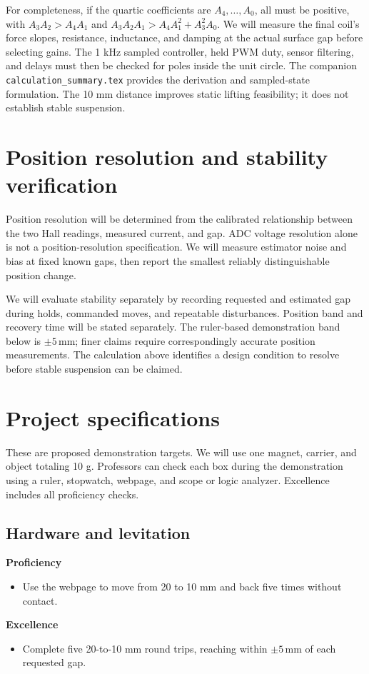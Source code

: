 \documentclass[11pt,letterpaper]{article}
\newcommand{\checkitem}{\item[$\square$]}
\begin{document}
For completeness, if the quartic coefficients are \(A_4,\ldots,A_0\),
all must be positive, with \(A_3A_2>A_4A_1\) and
\(A_3A_2A_1>A_4A_1^2+A_3^2A_0\). We will measure the final coil's
force slopes, resistance, inductance, and damping at the actual surface
gap before selecting gains. The 1 kHz sampled controller, held PWM duty,
sensor filtering, and delays must then be checked for poles inside the
unit circle. The companion \texttt{calculation\_summary.tex} provides the
derivation and sampled-state formulation. The 10 mm distance improves
static lifting feasibility; it does not establish stable suspension.

\section{Position resolution and stability verification}
Position resolution will be determined from the calibrated relationship
between the two Hall readings, measured current, and gap. ADC voltage
resolution alone is not a position-resolution specification. We will
measure estimator noise and bias at fixed known gaps, then report the
smallest reliably distinguishable position change.

We will evaluate stability separately by recording requested and estimated
gap during holds, commanded moves, and repeatable disturbances. Position
band and recovery time will be stated separately. The ruler-based
demonstration band below is \(\pm5\,\mathrm{mm}\); finer claims require
correspondingly accurate position measurements. The calculation above
identifies a design condition to resolve before stable suspension can be
claimed.

\clearpage
\section{Project specifications}
These are proposed demonstration targets. We will use one magnet, carrier,
and object totaling 10 g. Professors can check each box during the
demonstration using a ruler, stopwatch, webpage, and scope or logic analyzer.
Excellence includes all proficiency checks.

\subsection{Hardware and levitation}
\textbf{Proficiency}
\begin{itemize}
 \checkitem Use the webpage to move from 20 to 10 mm and back five times
 without contact.
\end{itemize}
\textbf{Excellence}
\begin{itemize}
 \checkitem Complete five 20-to-10 mm round trips, reaching within
 \(\pm5\,\mathrm{mm}\) of each requested gap.
\end{itemize}
\end{document}
